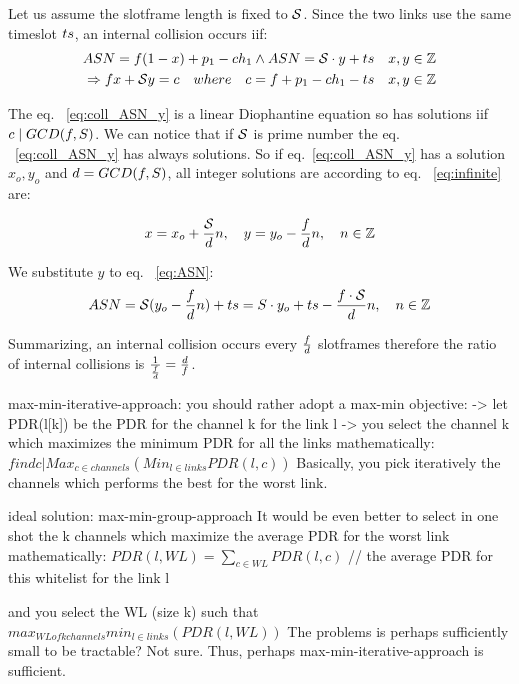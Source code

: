 \documentclass{article}
\begin{document}
Let us assume the slotframe length is fixed to $\mathcal{S}$.
Since the two links use the same timeslot $ts$, an internal collision occurs iif:
\begin{eqnarray} 
	ASN=f(1-x)+p_1-ch_1 \wedge ASN=\mathcal{S} \cdot y+ts \quad x,y  \in \mathbb{Z}  \label{eq:ASN}\\
	\Rightarrow fx+\mathcal{S} y=c  \quad where \quad c= f+p_1-ch_1 -ts 
    \quad x,y \in \mathbb{Z}
	\label{eq:coll_ASN_y}
\end{eqnarray}

The eq. ~\ref{eq:coll_ASN_y} is a linear Diophantine equation so has solutions iif $c \mid GCD(f,S)$. We can notice that if $\mathcal{S}$ is prime number the eq.  ~\ref{eq:coll_ASN_y} has always solutions. So if eq.~\ref{eq:coll_ASN_y} has a solution $x_o,y_o$ and $d=GCD(f,S)$, all integer solutions are according to eq. ~\ref{eq:infinite} are:

\begin{equation}
	x=x_{o}+\frac{\mathcal{S}}{d}n  , \quad
    y=y_{o}-\frac{f}{d}n , \quad n \in \mathbb{Z}
    \label{eq:infinite}
 \end{equation}

We substitute $y$ to eq. ~\ref{eq:ASN}:
\begin{eqnarray}
ASN=\mathcal{S}(y_{o}-\frac{f}{d}n)+ts =S\cdot y_o +ts-\frac{f\cdot \mathcal{S}}{d}n, \quad n \in \mathbb{Z}
\end{eqnarray}

Summarizing, an internal collision occurs every  $\frac{f}{d}$ slotframes therefore the ratio of internal collisions is $\frac{1}{\frac{f}{d}}= \frac{d}{f}$.



max-min-iterative-approach: you should rather adopt a max-min objective:
-> let PDR(l[k]) be the PDR for the channel k for the link l
-> you select the channel k which maximizes the minimum PDR for all the links
mathematically:
$find c |  Max_{c \in channels} \left( Min_{l \in links} PDR(l,c) \right)$
Basically, you pick iteratively the channels which performs the best for the worst link. 

ideal solution: max-min-group-approach
It would be even better to select in one shot the k channels which maximize the average PDR for the worst link
mathematically:
$PDR(l , WL) = \sum_{c \in WL} PDR(l, c)  $		// the average PDR for this whitelist for the link l

and you select the WL (size k) such that
$max_{WL of k channels}  min_{l \in links} (PDR(l, WL))$
The problems is perhaps sufficiently small to be tractable? Not sure. Thus, perhaps max-min-iterative-approach is sufficient. 
\end{document}
